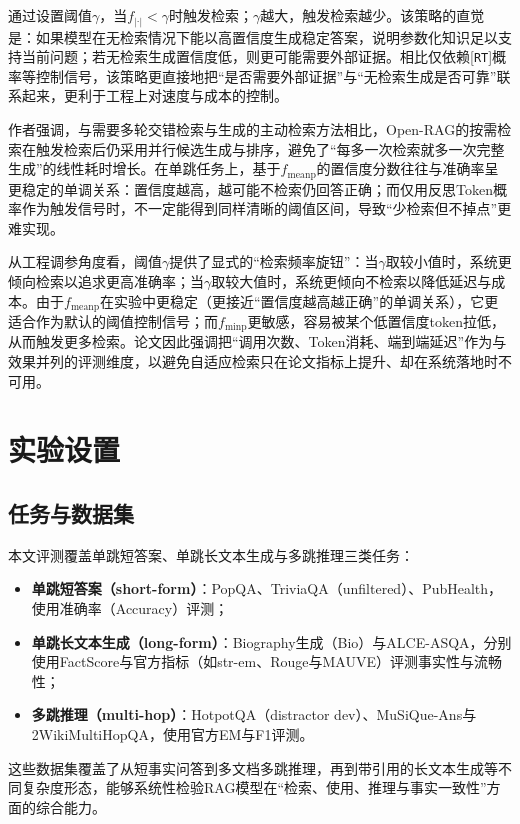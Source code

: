 通过设置阈值$\gamma$，当$f_{|\cdot|}<\gamma$时触发检索；$\gamma$越大，触发检索越少。该策略的直觉是：如果模型在无检索情况下能以高置信度生成稳定答案，说明参数化知识足以支持当前问题；若无检索生成置信度低，则更可能需要外部证据。相比仅依赖[\texttt{RT}]概率等控制信号，该策略更直接地把“是否需要外部证据”与“无检索生成是否可靠”联系起来，更利于工程上对速度与成本的控制。

作者强调，与需要多轮交错检索与生成的主动检索方法相比，Open-RAG的按需检索在触发检索后仍采用并行候选生成与排序，避免了“每多一次检索就多一次完整生成”的线性耗时增长。在单跳任务上，基于$f_{\mathrm{meanp}}$的置信度分数往往与准确率呈更稳定的单调关系：置信度越高，越可能不检索仍回答正确；而仅用反思Token概率作为触发信号时，不一定能得到同样清晰的阈值区间，导致“少检索但不掉点”更难实现。

从工程调参角度看，阈值$\gamma$提供了显式的“检索频率旋钮”：当$\gamma$取较小值时，系统更倾向检索以追求更高准确率；当$\gamma$取较大值时，系统更倾向不检索以降低延迟与成本。由于$f_{\mathrm{meanp}}$在实验中更稳定（更接近“置信度越高越正确”的单调关系），它更适合作为默认的阈值控制信号；而$f_{\mathrm{minp}}$更敏感，容易被某个低置信度token拉低，从而触发更多检索。论文因此强调把“调用次数、Token消耗、端到端延迟”作为与效果并列的评测维度，以避免自适应检索只在论文指标上提升、却在系统落地时不可用。
 
\section{实验设置}
\subsection{任务与数据集}
本文评测覆盖单跳短答案、单跳长文本生成与多跳推理三类任务：
 
\begin{itemize}
    \item \textbf{单跳短答案（short-form）}：PopQA、TriviaQA（unfiltered）、PubHealth，使用准确率（Accuracy）评测；
    \item \textbf{单跳长文本生成（long-form）}：Biography生成（Bio）与ALCE-ASQA，分别使用FactScore与官方指标（如str-em、Rouge与MAUVE）评测事实性与流畅性；
    \item \textbf{多跳推理（multi-hop）}：HotpotQA（distractor dev）、MuSiQue-Ans与2WikiMultiHopQA，使用官方EM与F1评测。
\end{itemize}
 
这些数据集覆盖了从短事实问答到多文档多跳推理，再到带引用的长文本生成等不同复杂度形态，能够系统性检验RAG模型在“检索、使用、推理与事实一致性”方面的综合能力。

